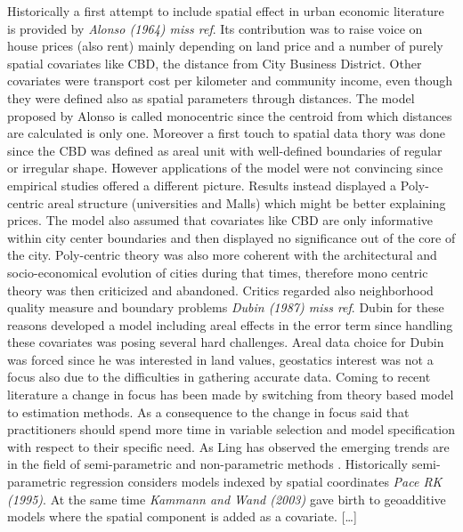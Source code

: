 \documentclass[
  12pt,
  a4paper,
  oneside]{book}
\begin{document}
Historically a first attempt to include spatial effect in urban economic literature is provided by \emph{Alonso (1964) miss ref}. Its contribution was to raise voice on house prices (also rent) mainly depending on land price and a number of purely spatial covariates like CBD, the distance from City Business District. Other covariates were transport cost per kilometer and community income, even though they were defined also as spatial parameters through distances. The model proposed by Alonso is called monocentric since the centroid from which distances are calculated is only one. Moreover a first touch to spatial data thory was done since the CBD was defined as areal unit with well-defined boundaries of regular or irregular shape. However applications of the model were not convincing since empirical studies offered a different picture. Results instead displayed a Poly-centric areal structure (universities and Malls) which might be better explaining prices. The model also assumed that covariates like CBD are only informative within city center boundaries and then displayed no significance out of the core of the city. Poly-centric theory was also more coherent with the architectural and socio-economical evolution of cities during that times, therefore mono centric theory was then criticized and abandoned. Critics regarded also neighborhood quality measure and boundary problems \emph{Dubin (1987) miss ref}. Dubin for these reasons developed a model including areal effects in the error term since handling these covariates was posing several hard challenges. Areal data choice for Dubin was forced since he was interested in land values, geostatics interest was not a focus also due to the difficulties in gathering accurate data. Coming to recent literature a change in focus has been made by switching from theory based model to estimation methods. As a consequence to the change in focus \citet{Ling} said that practitioners should spend more time in variable selection and model specification with respect to their specific need.
As Ling has observed the emerging trends are in the field of semi-parametric and non-parametric methods \citeyearpar{Ling}. Historically semi-parametric regression considers models indexed by spatial coordinates \emph{Pace RK (1995)}. At the same time \emph{Kammann and Wand (2003)} gave birth to geoadditive models where the spatial component is added as a covariate. {[}\ldots{]}
\end{document}
